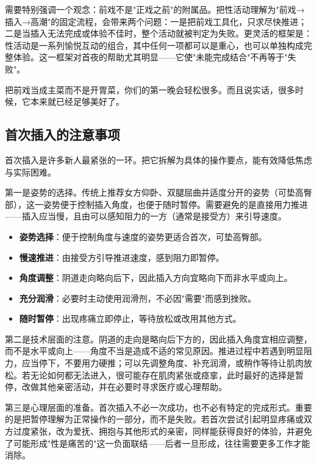 \documentclass[12pt,UTF8]{ctexbook}
\newcommand{\keyword}[1]{\textbf{#1}}
\begin{document}
需要特别强调一个观念：前戏不是"正戏之前"的附属品。把性活动理解为"前戏→插入→高潮"的固定流程，会带来两个问题：一是把前戏工具化，只求尽快推进；二是当插入无法完成或体验不佳时，整个活动就被判定为失败。更灵活的框架是：性活动是一系列愉悦互动的组合，其中任何一项都可以是重心，也可以单独构成完整体验。这一框架对首夜的帮助尤其明显——它使"未能完成结合"不再等于"失败"。

\begin{tcolorbox}[colback=pink!5!white,colframe=red!50!black,title=贴心小叮咛]
	把前戏当成主菜而不是开胃菜，你们的第一晚会轻松很多。而且说实话，很多时候，它本来就已经足够美好了。
\end{tcolorbox}
\subsection{首次插入的注意事项}

首次插入是许多新人最紧张的一环。把它拆解为具体的操作要点，能有效降低焦虑与实际困难。

第一是姿势的选择。传统上推荐女方仰卧、双腿屈曲并适度分开的姿势（可垫高臀部），这一姿势便于控制插入角度，也便于随时暂停。需要避免的是直接用力推进——插入应当慢，且由可以感知阻力的一方（通常是接受方）来引导速度。

\begin{itemize}
	\item \keyword{姿势选择}：便于控制角度与速度的姿势更适合首次，可垫高臀部。
	\item \keyword{慢速推进}：由接受方引导推进速度，感到阻力即暂停。
	\item \keyword{角度调整}：阴道走向略向后下，因此插入方向宜略向下而非水平或向上。
	\item \keyword{充分润滑}：必要时主动使用润滑剂，不必因"需要"而感到挫败。
	\item \keyword{随时暂停}：出现疼痛立即停止，等待放松或改用其他方式。
\end{itemize}

第二是技术层面的注意。阴道的走向是略向后下方的，因此插入角度宜相应调整，而不是水平或向上——角度不当是造成不适的常见原因。推进过程中若遇到明显阻力，应当停下，不要用力硬推；可以先调整角度、补充润滑，或稍作等待让肌肉放松。若无论如何都无法进入，很可能存在肌肉紧张或痉挛，此时最好的选择是暂停，改做其他亲密活动，并在必要时寻求医疗或心理帮助。

第三是心理层面的准备。首次插入不必一次成功，也不必有特定的完成形式。重要的是把暂停理解为正常操作的一部分，而不是失败。若首次尝试引起明显疼痛或双方过度紧张，改为爱抚、拥抱与其他形式的亲密，同样能获得良好的体验，并避免了可能形成"性是痛苦的"这一负面联结——后者一旦形成，往往需要更多工作才能消除。
\end{document}
